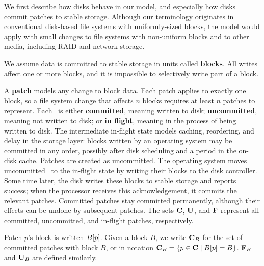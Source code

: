 We first describe how disks behave in our model, and
 especially how disks commit patches to stable storage.
%
Although our terminology originates in conventional disk-based file systems
 with uniformly-sized blocks, the model would apply with small changes to
 file systems with non-uniform blocks and to other media, including RAID
 and network storage.

We assume data is committed to stable storage in units called
 \textbf{blocks}.
%
All writes affect one or more blocks, and it is impossible to selectively
 write part of a block.

A \textbf{patch} models any change to block data.
%
Each patch applies to exactly one block, so a file system change that
 affects $n$ blocks requires at least $n$ patches to represent.
%
Each \patch\ is either
 \textbf{committed}, meaning written to disk;
 \textbf{uncommitted}, meaning not written to disk;
 or \textbf{in flight}, meaning in the process of being written to disk.
%
The intermediate in-flight state models caching, reordering, and delay in
 the storage layer: blocks written by an operating system may be
 committed in any order, possibly
 after disk scheduling and a period in the on-disk cache.
%
Patches are created as uncommitted.
%
The operating system moves uncommitted \patches\ to the in-flight state
 by writing their blocks to the disk controller.  Some
 time later, the disk writes these blocks
 to stable storage and reports success; when the processor receives this
 acknowledgement, it commits the relevant patches.
%
Committed patches stay committed permanently, although their effects can
 be undone by subsequent patches.
%
The sets $\PDisk$, $\PMem$, and $\PInf$ represent all committed,
 uncommitted, and in-flight patches, respectively.
%
%

Patch $p$'s block is written $B[{p}]$.
%
Given a block $B$, we write $\PDisk[B]$ for the set of committed
 patches with block $B$, or in notation $\PDisk[B] = \{p\in\PDisk\mid\PBlock{p}=B\}$.
%
$\PInf[B]$ and $\PMem[B]$ are defined similarly.


